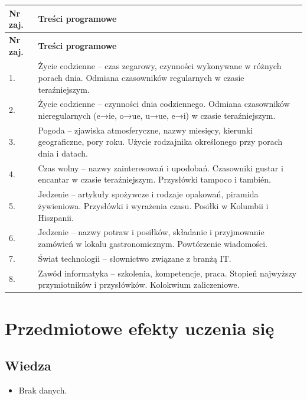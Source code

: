 \documentclass[12pt, a4paper]{article}
\newcommand{\thdrule}{\noalign{\global\setlength{\extrarowheight}{0pt}}}
\newcommand{\thdend}{\noalign{\global\setlength{\extrarowheight}{3pt}}}
\begin{document}
{\scriptsize
\begin{longtable}{m{1.5cm}m{14.5cm}}
\thdrule\toprule
\rowcolor{pjatkRed} {\color{white}\textbf{Nr zaj.}} & {\color{white}\textbf{Treści programowe}} \\
\midrule\thdend
\endfirsthead
\thdrule\toprule
\rowcolor{pjatkRed} {\color{white}\textbf{Nr zaj.}} & {\color{white}\textbf{Treści programowe}} \\
\midrule\thdend
\endhead
  \rowcolor{tableRowLight} 1. & Życie codzienne – czas zegarowy, czynności wykonywane w różnych porach dnia. Odmiana czasowników regularnych w czasie teraźniejszym. \\
  \rowcolor{tableRowAlt} 2. & Życie codzienne – czynności dnia codziennego. Odmiana czasowników nieregularnych (e→ie, o→ue, u→ue, e→i) w czasie teraźniejszym. \\
  \rowcolor{tableRowLight} 3. & Pogoda – zjawiska atmosferyczne, nazwy miesięcy, kierunki geograficzne, pory roku. Użycie rodzajnika określonego przy porach dnia i datach. \\
  \rowcolor{tableRowAlt} 4. & Czas wolny – nazwy zainteresowań i upodobań. Czasowniki gustar i encantar w czasie teraźniejszym. Przysłówki tampoco i también. \\
  \rowcolor{tableRowLight} 5. & Jedzenie – artykuły spożywcze i rodzaje opakowań, piramida żywieniowa. Przysłówki i wyrażenia czasu. Posiłki w Kolumbii i Hiszpanii. \\
  \rowcolor{tableRowAlt} 6. & Jedzenie – nazwy potraw i posiłków, składanie i przyjmowanie zamówień w lokalu gastronomicznym. Powtórzenie wiadomości. \\
  \rowcolor{tableRowLight} 7. & Świat technologii – słownictwo związane z branżą IT. \\
  \rowcolor{tableRowAlt} 8. & Zawód informatyka – szkolenia, kompetencje, praca. Stopień najwyższy przymiotników i przysłówków. Kolokwium zaliczeniowe. \\
\bottomrule
\end{longtable}}

\section{Przedmiotowe efekty uczenia się}

\subsection*{Wiedza}
\begin{itemize}
  \item Brak danych.
\end{itemize}
\end{document}
